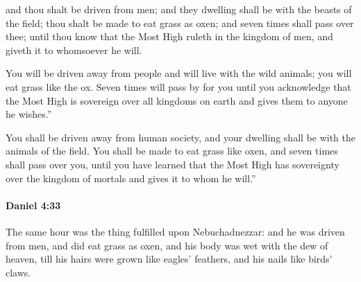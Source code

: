 			\begin{versebox}
					\item[BHS] 
					\item[ASV] and thou shalt be driven from men; and they dwelling shall be with the beasts of the field; thou shalt be made to eat grass as oxen; and seven times shall pass over thee; until thou know that the Most High ruleth in the kingdom of men, and giveth it to whomsoever he will.
					\item[NIV] You will be driven away from people and will live with the wild animals; you will eat grass like the ox. Seven times will pass by for you until you acknowledge that the Most High is sovereign over all kingdoms on earth and gives them to anyone he wishes.”
					\item[NRSV] You shall be driven away from human society, and your dwelling shall be with the animals of the field. You shall be made to eat grass like oxen, and seven times shall pass over you, until you have learned that the Most High has sovereignty over the kingdom of mortals and gives it to whom he will.”
			\end{versebox}

		\paragraph{Daniel 4:33} %
			\label{DANIEL-4-33}

			The same hour was the thing fulfilled upon Nebuchadnezzar: and he was driven from men, and did eat grass as oxen, and his body was wet with the dew of heaven, till his hairs were grown like eagles’ feathers, and his nails like birds’ claws.


